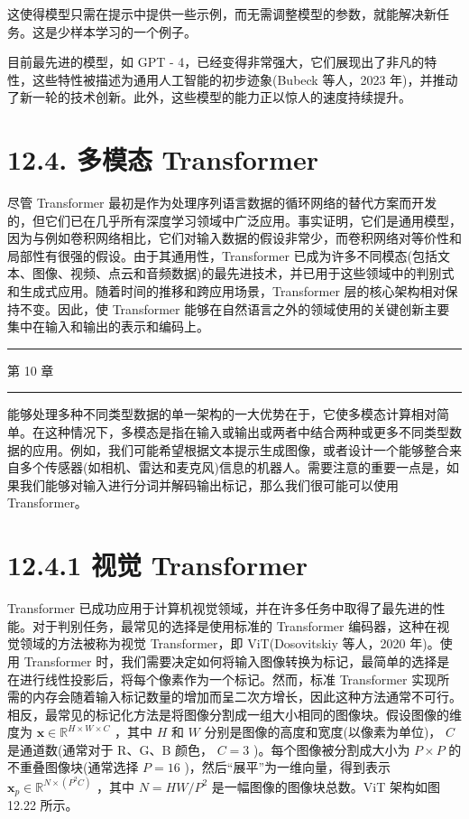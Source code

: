 \documentclass[10pt]{article}
\newcommand{\HRule}{\begin{center}\rule{0.9\linewidth}{0.2mm}\end{center}}
\begin{document}
这使得模型只需在提示中提供一些示例，而无需调整模型的参数，就能解决新任务。这是少样本学习的一个例子。

目前最先进的模型，如 GPT - 4，已经变得非常强大，它们展现出了非凡的特性，这些特性被描述为通用人工智能的初步迹象(Bubeck 等人，2023 年)，并推动了新一轮的技术创新。此外，这些模型的能力正以惊人的速度持续提升。

\section*{12.4. 多模态 Transformer}

尽管 Transformer 最初是作为处理序列语言数据的循环网络的替代方案而开发的，但它们已在几乎所有深度学习领域中广泛应用。事实证明，它们是通用模型，因为与例如卷积网络相比，它们对输入数据的假设非常少，而卷积网络对等价性和局部性有很强的假设。由于其通用性，Transformer 已成为许多不同模态(包括文本、图像、视频、点云和音频数据)的最先进技术，并已用于这些领域中的判别式和生成式应用。随着时间的推移和跨应用场景，Transformer 层的核心架构相对保持不变。因此，使 Transformer 能够在自然语言之外的领域使用的关键创新主要集中在输入和输出的表示和编码上。

\HRule

第 10 章

\HRule

能够处理多种不同类型数据的单一架构的一大优势在于，它使多模态计算相对简单。在这种情况下，多模态是指在输入或输出或两者中结合两种或更多不同类型数据的应用。例如，我们可能希望根据文本提示生成图像，或者设计一个能够整合来自多个传感器(如相机、雷达和麦克风)信息的机器人。需要注意的重要一点是，如果我们能够对输入进行分词并解码输出标记，那么我们很可能可以使用 Transformer。

\section*{12.4.1 视觉 Transformer}

Transformer 已成功应用于计算机视觉领域，并在许多任务中取得了最先进的性能。对于判别任务，最常见的选择是使用标准的 Transformer 编码器，这种在视觉领域的方法被称为视觉 Transformer，即 ViT(Dosovitskiy 等人，2020 年)。使用 Transformer 时，我们需要决定如何将输入图像转换为标记，最简单的选择是在进行线性投影后，将每个像素作为一个标记。然而，标准 Transformer 实现所需的内存会随着输入标记数量的增加而呈二次方增长，因此这种方法通常不可行。相反，最常见的标记化方法是将图像分割成一组大小相同的图像块。假设图像的维度为 \(\mathbf{x} \in  {\mathbb{R}}^{H \times  W \times  C}\) ，其中 \(H\) 和 \(W\) 分别是图像的高度和宽度(以像素为单位)， \(C\) 是通道数(通常对于 R、G、B 颜色， \(C = 3\) )。每个图像被分割成大小为 \(P \times  P\) 的不重叠图像块(通常选择 \(P = {16}\) )，然后“展平”为一维向量，得到表示 \({\mathbf{x}}_{p} \in  {\mathbb{R}}^{N \times  \left( {{P}^{2}C}\right) }\) ，其中 \(N = {HW}/{P}^{2}\) 是一幅图像的图像块总数。ViT 架构如图 12.22 所示。
\end{document}
